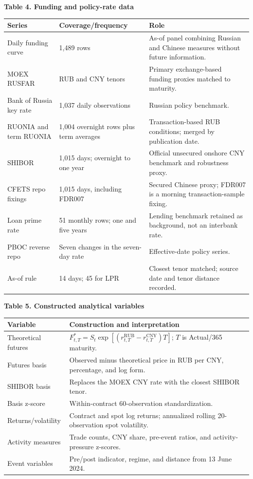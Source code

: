 \documentclass[11pt,a4paper]{article}
\begin{document}
\newpage

\textbf{Table 4. Funding and policy-rate data}

\begin{tabularx}{\textwidth}{@{}p{}p{}Y@{}}
\toprule
\textbf{Series} & \textbf{Coverage/frequency} & \textbf{Role} \\
\midrule
Daily funding curve & 1,489 rows & As-of panel combining Russian and Chinese measures without future information. \\
MOEX RUSFAR & RUB and CNY tenors & Primary exchange-based funding proxies matched to maturity. \\
Bank of Russia key rate & 1,037 daily observations & Russian policy benchmark. \\
RUONIA and term RUONIA & 1,004 overnight rows plus term averages & Transaction-based RUB conditions; merged by publication date. \\
SHIBOR & 1,015 days; overnight to one year & Official unsecured onshore CNY benchmark and robustness proxy. \\
CFETS repo fixings & 1,015 days, including FDR007 & Secured Chinese proxy; FDR007 is a morning transaction-sample fixing. \\
Loan prime rate & 51 monthly rows; one and five years & Lending benchmark retained as background, not an interbank rate. \\
PBOC reverse repo & Seven changes in the seven-day rate & Effective-date policy series. \\
As-of rule & 14 days; 45 for LPR & Closest tenor matched; source date and tenor distance recorded. \\
\bottomrule
\end{tabularx}

\textbf{Table 5. Constructed analytical variables}

\begin{tabularx}{\textwidth}{@{}p{}Y@{}}
\toprule
\textbf{Variable} & \textbf{Construction and interpretation} \\
\midrule
Theoretical futures & $F^{*}_{t,T}=S_t\exp[(r^{\mathrm{RUB}}_{t,T}-r^{\mathrm{CNY}}_{t,T})T]$; $T$ is Actual/365 maturity. \\
Futures basis & Observed minus theoretical price in RUB per CNY, percentage, and log form. \\
SHIBOR basis & Replaces the MOEX CNY rate with the closest SHIBOR tenor. \\
Basis z-score & Within-contract 60-observation standardization. \\
Returns/volatility & Contract and spot log returns; annualized rolling 20-observation spot volatility. \\
Activity measures & Trade counts, CNY share, pre-event ratios, and activity-pressure z-scores. \\
Event variables & Pre/post indicator, regime, and distance from 13 June 2024. \\
\bottomrule
\end{tabularx}
\end{document}
